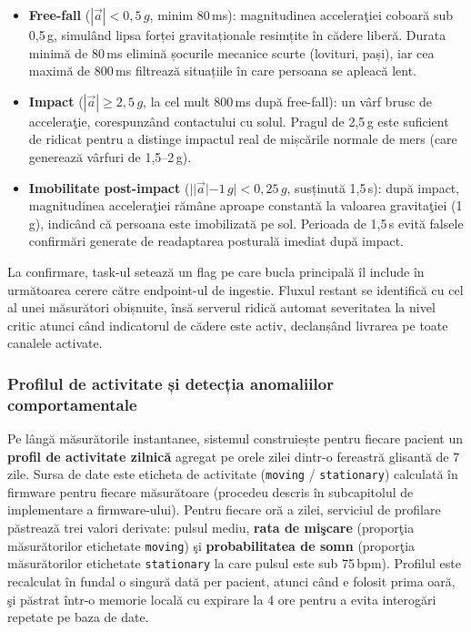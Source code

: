 \documentclass[12pt,a4paper,twoside]{article}
\begin{document}
\begin{itemize}[leftmargin=1.5em]
\item \textbf{Free-fall} ($|\vec{a}| < 0{,}5\,g$, minim 80\,ms): magnitudinea acceleraţiei coboară sub 0,5\,g, simulând lipsa forței gravitaționale resimțite în cădere liberă. Durata minimă de 80\,ms elimină șocurile mecanice scurte (lovituri, pași), iar cea maximă de 800\,ms filtrează situațiile în care persoana se apleacă lent.
\item \textbf{Impact} ($|\vec{a}| \geq 2{,}5\,g$, la cel mult 800\,ms după free-fall): un vârf brusc de acceleraţie, corespunzând contactului cu solul. Pragul de 2,5\,g este suficient de ridicat pentru a distinge impactul real de mișcările normale de mers (care generează vârfuri de 1,5--2\,g).
\item \textbf{Imobilitate post-impact} ($||\vec{a}| - 1\,g| < 0{,}25\,g$, susținută 1,5\,s): după impact, magnitudinea acceleraţiei rămâne aproape constantă la valoarea gravitaţiei (1\,g), indicând că persoana este imobilizată pe sol. Perioada de 1,5\,s evită falsele confirmări generate de readaptarea posturală imediat după impact.
\end{itemize} La confirmare, task-ul setează un flag pe care bucla principală îl include în următoarea cerere către endpoint-ul de ingestie. Fluxul restant se identifică cu cel al unei măsurători obișnuite, însă serverul ridică automat severitatea la nivel critic atunci când indicatorul de cădere este activ, declanșând livrarea pe toate canalele activate.

\subsubsection{Profilul de activitate și detecția anomaliilor comportamentale}

Pe lângă măsurătorile instantanee, sistemul construiește pentru fiecare pacient un \textbf{profil de activitate zilnică} agregat pe orele zilei dintr-o fereastră glisantă de 7 zile. Sursa de date este eticheta de activitate (\texttt{moving} / \texttt{stationary}) calculată în firmware pentru fiecare măsurătoare (procedeu descris în subcapitolul de implementare a firmware-ului). Pentru fiecare oră a zilei, serviciul de profilare păstrează trei valori derivate: pulsul mediu, \textbf{rata de mişcare} (proporţia măsurătorilor etichetate \texttt{moving}) şi \textbf{probabilitatea de somn} (proporţia măsurătorilor etichetate \texttt{stationary} la care pulsul este sub 75\,bpm). Profilul este recalculat în fundal o singură dată per pacient, atunci când e folosit prima oară, şi păstrat într-o memorie locală cu expirare la 4 ore pentru a evita interogări repetate pe baza de date.
\end{document}
